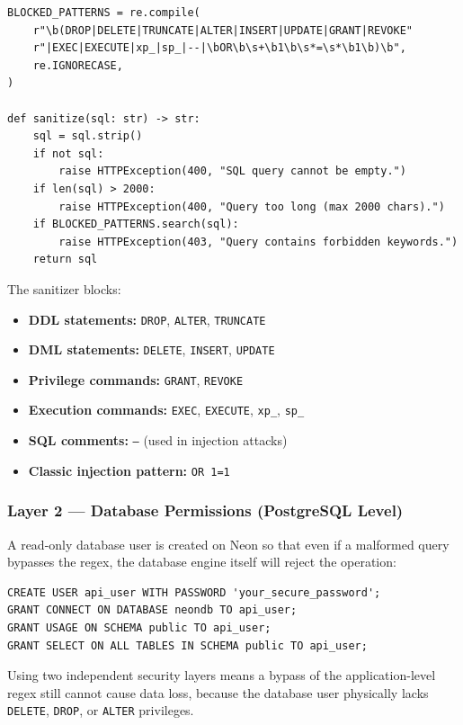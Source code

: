 \documentclass[12pt, a4paper]{article}
\begin{document}
\begin{lstlisting}[style=pythonstyle, caption={Sanitization function in main.py}]
BLOCKED_PATTERNS = re.compile(
    r"\b(DROP|DELETE|TRUNCATE|ALTER|INSERT|UPDATE|GRANT|REVOKE"
    r"|EXEC|EXECUTE|xp_|sp_|--|\bOR\b\s+\b1\b\s*=\s*\b1\b)\b",
    re.IGNORECASE,
)

def sanitize(sql: str) -> str:
    sql = sql.strip()
    if not sql:
        raise HTTPException(400, "SQL query cannot be empty.")
    if len(sql) > 2000:
        raise HTTPException(400, "Query too long (max 2000 chars).")
    if BLOCKED_PATTERNS.search(sql):
        raise HTTPException(403, "Query contains forbidden keywords.")
    return sql
\end{lstlisting}

The sanitizer blocks:
\begin{itemize}[leftmargin=1.5em]
  \item \textbf{DDL statements:} \texttt{DROP}, \texttt{ALTER}, \texttt{TRUNCATE}
  \item \textbf{DML statements:} \texttt{DELETE}, \texttt{INSERT}, \texttt{UPDATE}
  \item \textbf{Privilege commands:} \texttt{GRANT}, \texttt{REVOKE}
  \item \textbf{Execution commands:} \texttt{EXEC}, \texttt{EXECUTE}, \texttt{xp\_}, \texttt{sp\_}
  \item \textbf{SQL comments:} \texttt{--} (used in injection attacks)
  \item \textbf{Classic injection pattern:} \texttt{OR 1=1}
\end{itemize}

\subsubsection{Layer 2 — Database Permissions (PostgreSQL Level)}

A read-only database user is created on Neon so that even if a malformed query
bypasses the regex, the database engine itself will reject the operation:

\begin{lstlisting}[style=sqlstyle, caption={Read-only user setup on Neon}]
CREATE USER api_user WITH PASSWORD 'your_secure_password';
GRANT CONNECT ON DATABASE neondb TO api_user;
GRANT USAGE ON SCHEMA public TO api_user;
GRANT SELECT ON ALL TABLES IN SCHEMA public TO api_user;
\end{lstlisting}

\begin{infobox}
  Using two independent security layers means a bypass of the application-level
  regex still cannot cause data loss, because the database user physically lacks
  \texttt{DELETE}, \texttt{DROP}, or \texttt{ALTER} privileges.
\end{infobox}
\end{document}
